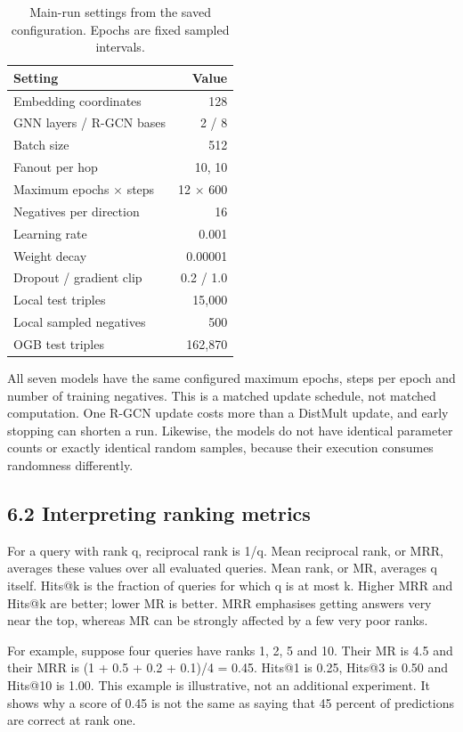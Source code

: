\documentclass[11pt]{article}
\begin{document}
\begin{table}[t]\centering\small
\setlength{\tabcolsep}{3pt}
\begin{tabular}{lr}
\toprule
Setting & Value \\ \midrule
Embedding coordinates & 128 \\
GNN layers / R-GCN bases & 2 / 8 \\
Batch size & 512 \\
Fanout per hop & 10, 10 \\
Maximum epochs $\times$ steps & 12 $\times$ 600 \\
Negatives per direction & 16 \\
Learning rate & 0.001 \\
Weight decay & 0.00001 \\
Dropout / gradient clip & 0.2 / 1.0 \\
Local test triples & 15,000 \\
Local sampled negatives & 500 \\
OGB test triples & 162,870 \\
\bottomrule\end{tabular}
\caption{Main-run settings from the saved configuration. Epochs are fixed sampled intervals.}\end{table}
All seven models have the same configured maximum epochs, steps per epoch and number of training negatives. This is a matched update schedule, not matched computation. One R-GCN update costs more than a DistMult update, and early stopping can shorten a run. Likewise, the models do not have identical parameter counts or exactly identical random samples, because their execution consumes randomness differently.

\subsection*{6.2 Interpreting ranking metrics}
For a query with rank q, reciprocal rank is 1/q. Mean reciprocal rank, or MRR, averages these values over all evaluated queries. Mean rank, or MR, averages q itself. Hits@k is the fraction of queries for which q is at most k. Higher MRR and Hits@k are better; lower MR is better. MRR emphasises getting answers very near the top, whereas MR can be strongly affected by a few very poor ranks.

For example, suppose four queries have ranks 1, 2, 5 and 10. Their MR is 4.5 and their MRR is (1 + 0.5 + 0.2 + 0.1)/4 = 0.45. Hits@1 is 0.25, Hits@3 is 0.50 and Hits@10 is 1.00. This example is illustrative, not an additional experiment. It shows why a score of 0.45 is not the same as saying that 45 percent of predictions are correct at rank one.
\end{document}
